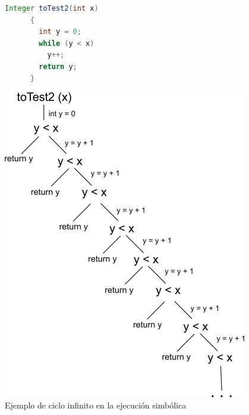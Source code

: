 \documentclass{llncs}
\begin{document}
\begin{figure}[hbt!]
   \centering
    \begin{minipage}[H]{0.5\textwidth}
      \begin{lstlisting}[language=Java]
	Integer toTest2(int x)
	  {
	    int y = 0;
	    while (y < x)
	      y++;
	    return y;
	  }
      \end{lstlisting}
    \end{minipage}
  \begin{minipage}[H]{0.45\textwidth}
    \centering
    \includegraphics[width=0.95\textwidth]{cicloInf}
  \end{minipage}
  \caption{Ejemplo de ciclo infinito en la ejecución simbólica}
  \label{cicloInf}
\end{figure}
\end{document}
